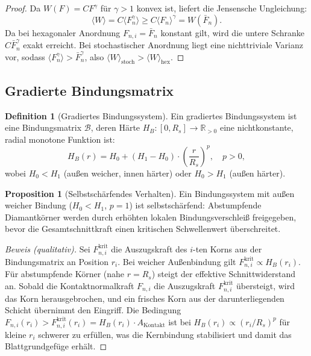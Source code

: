 ﻿\documentclass[a4paper,12pt]{article}
\theoremstyle{definition}
\newtheorem{definition}{Definition}
\newtheorem{proposition}{Proposition}
\begin{document}
\begin{proof}
Da $W(F) = CF^{\gamma}$ für $\gamma > 1$ konvex ist, liefert die Jensensche Ungleichung:
\[
\langle W \rangle = C \langle F_n^{\gamma} \rangle \geq C \langle F_n \rangle^{\gamma} = W(\bar{F}_n).
\]
Da bei hexagonaler Anordnung $F_{n,i} = \bar{F}_n$ konstant gilt, wird die untere Schranke
$C\bar{F}_n^{\gamma}$ exakt erreicht. Bei stochastischer Anordnung liegt eine nichttriviale
Varianz vor, sodass $\langle F_n^{\gamma}\rangle > \bar{F}_n^{\gamma}$, also
$\langle W\rangle_{\mathrm{stoch}} > \langle W\rangle_{\mathrm{hex}}$.
\end{proof}

\subsection{Gradierte Bindungsmatrix}
\label{sec:bindung}

\begin{definition}[Gradiertes Bindungssystem]
Ein gradiertes Bindungssystem ist eine Bindungsmatrix $\mathcal{B}$, deren
Härte $H_B: [0, R_s] \to \mathbb{R}_{>0}$ eine nichtkonstante, radial monotone Funktion ist:
\[
H_B(r) = H_0 + (H_1 - H_0)\cdot\left(\frac{r}{R_s}\right)^{p}, \quad p > 0,
\]
wobei $H_0 < H_1$ (außen weicher, innen härter) oder $H_0 > H_1$ (außen härter).
\end{definition}

\begin{proposition}[Selbstschärfendes Verhalten]
\label{prop:selbstschaerfend}
Ein Bindungssystem mit außen weicher Bindung ($H_0 < H_1$, $p = 1$) ist selbstschärfend:
Abstumpfende Diamantkörner werden durch erhöhten lokalen Bindungsverschleiß freigegeben,
bevor die Gesamtschnittkraft einen kritischen Schwellenwert überschreitet.
\end{proposition}

\begin{proof}[Beweis (qualitativ)]
Sei $F_{n,i}^{\mathrm{krit}}$ die Auszugskraft des $i$-ten Korns aus der Bindungsmatrix
an Position $r_i$. Bei weicher Außenbindung gilt $F_{n,i}^{\mathrm{krit}} \propto H_B(r_i)$.
Für abstumpfende Körner (nahe $r = R_s$) steigt der effektive Schnittwiderstand an.
Sobald die Kontaktnormalkraft $F_{n,i}$ die Auszugskraft $F_{n,i}^{\mathrm{krit}}$ übersteigt,
wird das Korn herausgebrochen, und ein frisches Korn aus der darunterliegenden Schicht
übernimmt den Eingriff. Die Bedingung $F_{n,i}(r_i) > F_{n,i}^{\mathrm{krit}}(r_i) = H_B(r_i) \cdot A_{\mathrm{Kontakt}}$
ist bei $H_B(r_i) \propto (r_i/R_s)^p$ für kleine $r_i$ schwerer zu erfüllen,
was die Kernbindung stabilisiert und damit das Blattgrundgefüge erhält.
\end{proof}
\end{document}
